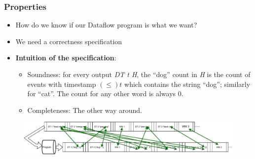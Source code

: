 \documentclass[aspectratio=169,10pt]{beamer}
\begin{document}
\begin{frame}
  \frametitle{Properties}
  \begin{itemize}
    \item How do we know if our Dataflow program is what we want?
          \pause
    \item We need a correctness specification
          \pause
    \item \textbf{Intuition of the specification}:
          \begin{itemize}
            \item Soundness: for every output \textit{DT t H}, the ``dog'' count in \textit{H} is the count of events with timestamp $(\le) t$ which contains the string ``dog''; similarly for ``cat''. The count for any other word is always 0.
            \item Completeness: The other way around.
          \end{itemize}
  \end{itemize}
  \begin{figure}
    \centering
    \includegraphics[width=.75\textwidth]{correctness.pdf}
  \end{figure}
\end{frame}
\end{document}
